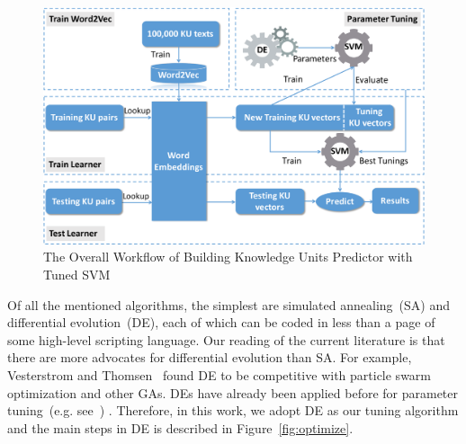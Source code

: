 \documentclass[sigconf,review, anonymous]{acmart}
\theoremstyle{break}
\newcommand{\fig}[1]{Figure~\ref{fig:#1}}
\begin{document}
 \begin{figure}
    \centering
     \includegraphics[width=\textwidth]{pic/workflow.pdf} %
    \caption{The Overall Workflow of Building Knowledge Units Predictor with Tuned SVM}
    \label{fig:workflow}
\end{figure}

Of all the mentioned algorithms,  the simplest are simulated annealing~(SA)  and 
differential evolution~(DE), each of which can be coded in less than a page of some high-level scripting language.
 Our reading of the current literature is that there are more  advocates for
differential evolution than SA. For example,  Vesterstrom and Thomsen~\cite{Vesterstrom04} found DE to be competitive with 
 particle swarm optimization and other GAs.  DEs have already been applied before for 
 parameter tuning~(e.g. see~\cite{omran2005differential, chiha2012tuning, fu2016tuning, fu2016differential, agrawal2016wrong}) .
Therefore, in this work, we adopt DE as our tuning algorithm and 
the main steps in DE is described in \fig{optimize}.

\end{document}
